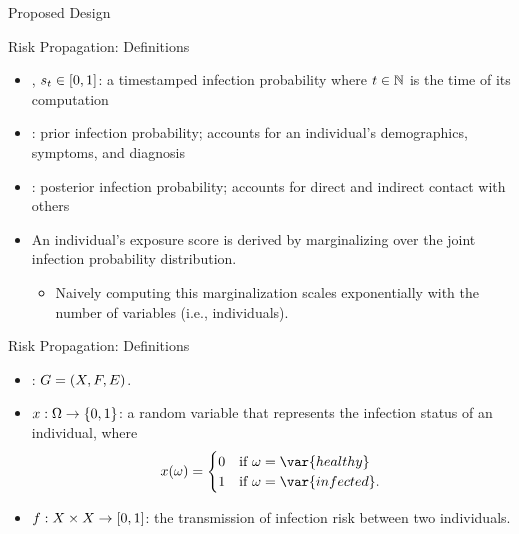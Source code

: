 \documentclass[11pt]{beamer}
\begin{document}
\begin{section}{Proposed Design}

\begin{frame}{Risk Propagation: Definitions}
\begin{itemize}
  \item {}, $s_t \in [0, 1]$: a timestamped infection probability where $t \in \mathbb{N}$ is the time of its computation
  \item {}: prior infection probability; accounts for an individual's demographics, symptoms, and diagnosis \citep{Briers2020, Menni2020}
  \item {}: posterior infection probability; accounts for direct and indirect contact with others
  \item An individual's exposure score is derived by marginalizing over the joint infection probability distribution.
    \begin{itemize}
      \item Naively computing this marginalization scales exponentially with the number of variables (i.e., individuals).
    \end{itemize}
\end{itemize}
\end{frame}

\begin{frame}{Risk Propagation: Definitions}
\begin{itemize}
  \item {}: $G = (X, F, E)$.
  \pause
  \item {} $\vVariable: \eventSpace \rightarrow \{0, 1\} $: a random variable that represents the infection status of an individual, where
    \begin{equation*}
      \vVariable(\event) =
        \begin{cases}
          0 & \text{if } \event = \var{healthy} \\
          1 & \text{if } \event = \var{infected}.
        \end{cases}
    \end{equation*}
    \pause
    \item {} $\vFactor: \vVariables \times \vVariables \rightarrow [0, 1]$: the transmission of infection risk between two individuals.
\end{itemize}


\end{frame}
\end{section}
\end{document}
